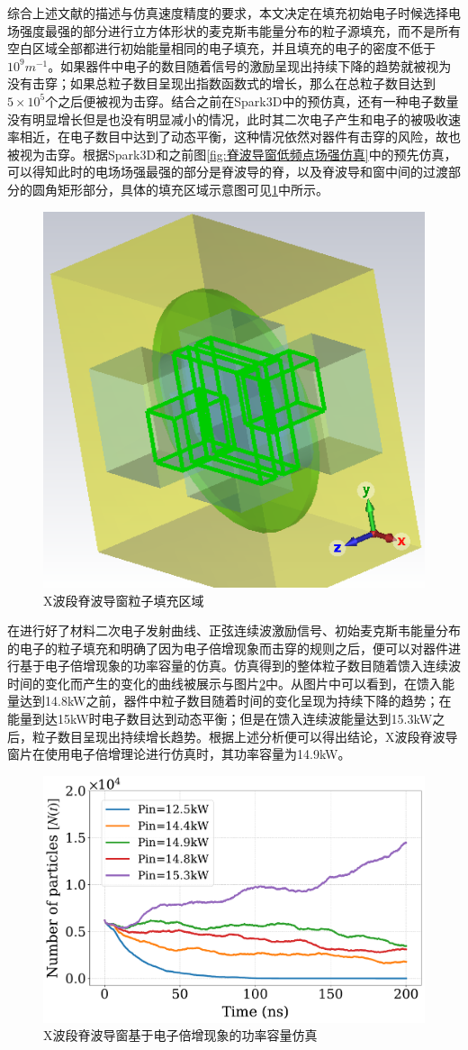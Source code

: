\documentclass[master]{thesis-uestc}
\begin{document}
综合上述文献的描述与仿真速度精度的要求，本文决定在填充初始电子时候选择电场强度最强的部分进行立方体形状的麦克斯韦能量分布的粒子源填充，而不是所有空白区域全部都进行初始能量相同的电子填充，并且填充的电子的密度不低于$10^9 m^{-1}$。如果器件中电子的数目随着信号的激励呈现出持续下降的趋势就被视为没有击穿；如果总粒子数目呈现出指数函数式的增长，那么在总粒子数目达到$5 \times 10^5$个之后便被视为击穿。结合之前在Spark3D中的预仿真，还有一种电子数量没有明显增长但是也没有明显减小的情况，此时其二次电子产生和电子的被吸收速率相近，在电子数目中达到了动态平衡，这种情况依然对器件有击穿的风险，故也被视为击穿。根据Spark3D和之前图\ref{fig:脊波导窗低频点场强仿真}中的预先仿真，可以得知此时的电场场强最强的部分是脊波导的脊，以及脊波导和窗中间的过渡部分的圆角矩形部分，具体的填充区域示意图可见\ref{fig:X粒子填充区域}中所示。
\begin{figure}[!htb]
    \centering
    \includegraphics[width=0.5\linewidth]{pic/chapter3/粒子填充区域斜视图.png}
    \caption{X波段脊波导窗粒子填充区域}
    \label{fig:X粒子填充区域}
\end{figure}

在进行好了材料二次电子发射曲线、正弦连续波激励信号、初始麦克斯韦能量分布的电子的粒子填充和明确了因为电子倍增现象而击穿的规则之后，便可以对器件进行基于电子倍增现象的功率容量的仿真。仿真得到的整体粒子数目随着馈入连续波时间的变化而产生的变化的曲线被展示与图片\ref{fig:X波段脊波导窗基于电子倍增现象的功率容量仿真}中。从图片中可以看到，在馈入能量达到14.8kW之前，器件中粒子数目随着时间的变化呈现为持续下降的趋势；在能量到达15kW时电子数目达到动态平衡；但是在馈入连续波能量达到15.3kW之后，粒子数目呈现出持续增长趋势。根据上述分析便可以得出结论，X波段脊波导窗片在使用电子倍增理论进行仿真时，其功率容量为14.9kW。
\begin{figure}[!htb]
    \centering
    \includegraphics[width=0.5\linewidth]{pic/chapter3/particle_time_chapter3.pdf}
    \caption{X波段脊波导窗基于电子倍增现象的功率容量仿真}
    \label{fig:X波段脊波导窗基于电子倍增现象的功率容量仿真}
\end{figure}
\end{document}
